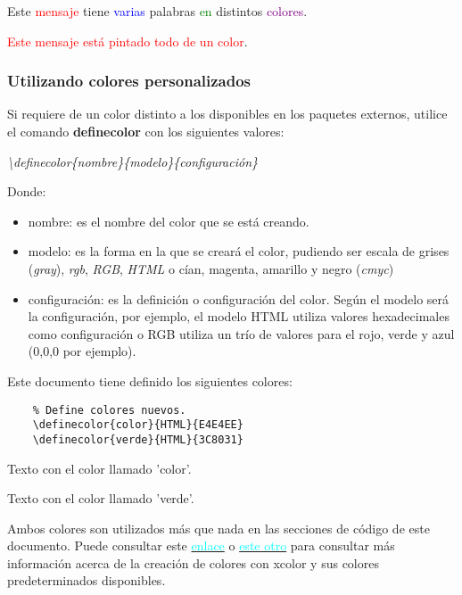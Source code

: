 Este \textcolor{red}{mensaje} tiene \textcolor{blue}{varias} palabras \textcolor{green}{en} distintos \textcolor{purple}{colores}.

\textcolor{red}{Este mensaje está pintado todo de un color}.


\subsubsection{Utilizando colores personalizados}

Si requiere de un color distinto a los disponibles en los paquetes externos, utilice el comando \textbf{definecolor} con los siguientes valores:
\begin{center}
    \textit{\textbackslash{definecolor\{nombre\}\{modelo\}\{configuración\}}}
\end{center}

Donde:
\begin{itemize}
    \item nombre: es el nombre del color que se está creando.
    \item modelo: es la forma en la que se creará el color, pudiendo ser escala de grises (\textit{gray}), \textit{rgb}, \textit{RGB}, \textit{HTML} o cían, magenta, amarillo y negro (\textit{cmyc})
    \item configuración: es la definición o configuración del color. Según el modelo será la configuración, por ejemplo, el modelo HTML utiliza valores hexadecimales como configuración o RGB utiliza un trío de valores para el rojo, verde y azul (0,0,0 por ejemplo).
\end{itemize}

Este documento tiene definido los siguientes colores:
\begin{lstlisting}
    % Define colores nuevos.
    \definecolor{color}{HTML}{E4E4EE}
    \definecolor{verde}{HTML}{3C8031}
\end{lstlisting}

\textcolor{color}{Texto con el color llamado 'color'}.

\textcolor{verde}{Texto con el color llamado 'verde'}.

Ambos colores son utilizados más que nada en las secciones de código de este documento. Puede consultar este \href{https://www.overleaf.com/learn/latex/Using_colours_in_LaTeX#Creating_your_own_colours}{\textcolor{cyan}{enlace}} o \href{https://en.wikibooks.org/wiki/LaTeX/Colors}{\textcolor{cyan}{este otro}} para consultar más información acerca de la creación de colores con xcolor y sus colores predeterminados disponibles.


